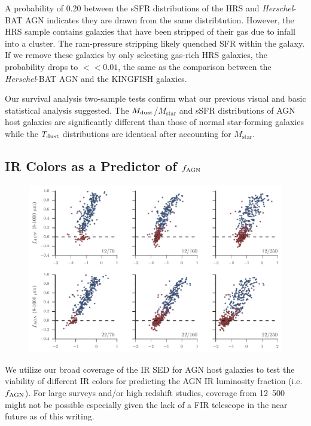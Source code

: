 \documentclass[fleqn, usenatbib]{mnras}
\newcommand{\herschel}{\emph{Herschel}}
\newcommand{\mstar}{$M_{\mathrm{star}}$}
\newcommand{\mdust}{$M_{\rm dust}$}
\newcommand{\tdust}{$T_{\rm dust}$}
\begin{document}
A probability of 0.20 between the sSFR distributions of the HRS and \herschel-BAT AGN indicates they are drawn from the same distribtution. However, the HRS sample contains galaxies that have been stripped of their gas due to infall into a cluster. The ram-pressure stripping likely quenched SFR within the galaxy. If we remove these galaxies by only selecting gas-rich HRS galaxies, the probability drops to $<<0.01$, the same as the comparison between the \herschel-BAT AGN and the KINGFISH galaxies.

Our survival analysis two-sample tests confirm what our previous visual and basic statistical analysis suggested. The \mdust/\mstar{} and sSFR distributions of AGN host galaxies are significantly different than those of normal star-forming galaxies while the \tdust{} distributions are identical after accounting for \mstar. 

\subsection{IR Colors as a Predictor of $f_{\rm AGN}$}

\begin{figure}
\includegraphics[width=\textwidth]{figures/agnfrac_vs_flux_ratio}
\caption{\label{fig:agnfrac_vs_flux_ratio}}
\end{figure}

We utilize our broad coverage of the IR SED for AGN host galaxies to test the viability of different IR colors for predicting the AGN IR luminosity fraction (i.e. $f_{\rm AGN}$). For large surveys and/or high redshift studies, coverage from 12--500 \micron{} might not be possible especially given the lack of a FIR telescope in the near future as of this writing. 
\end{document}
